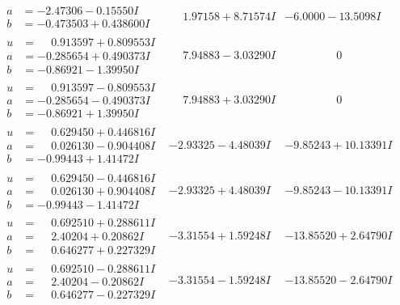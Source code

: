 \documentclass[1p]{elsarticle_modified}
\theoremstyle{definition}
\begin{document}
$$\begin{array}{c|c|c}
\begin{aligned}
a &= -2.47306 - 0.15550 I \\
b &= -0.473503 + 0.438600 I\end{aligned}
 & \phantom{-}1.97158 + 8.71574 I & -6.0000 - 13.5098 I \\ \hline\begin{aligned}
u &= \phantom{-}0.913597 + 0.809553 I \\
a &= -0.285654 + 0.490373 I \\
b &= -0.86921 - 1.39950 I\end{aligned}
 & \phantom{-}7.94883 - 3.03290 I & \phantom{-0.000000 } 0 \\ \hline\begin{aligned}
u &= \phantom{-}0.913597 - 0.809553 I \\
a &= -0.285654 - 0.490373 I \\
b &= -0.86921 + 1.39950 I\end{aligned}
 & \phantom{-}7.94883 + 3.03290 I & \phantom{-0.000000 } 0 \\ \hline\begin{aligned}
u &= \phantom{-}0.629450 + 0.446816 I \\
a &= \phantom{-}0.026130 - 0.904408 I \\
b &= -0.99443 + 1.41472 I\end{aligned}
 & -2.93325 - 4.48039 I & -9.85243 + 10.13391 I \\ \hline\begin{aligned}
u &= \phantom{-}0.629450 - 0.446816 I \\
a &= \phantom{-}0.026130 + 0.904408 I \\
b &= -0.99443 - 1.41472 I\end{aligned}
 & -2.93325 + 4.48039 I & -9.85243 - 10.13391 I \\ \hline\begin{aligned}
u &= \phantom{-}0.692510 + 0.288611 I \\
a &= \phantom{-}2.40204 + 0.20862 I \\
b &= \phantom{-}0.646277 + 0.227329 I\end{aligned}
 & -3.31554 + 1.59248 I & -13.85520 + 2.64790 I \\ \hline\begin{aligned}
u &= \phantom{-}0.692510 - 0.288611 I \\
a &= \phantom{-}2.40204 - 0.20862 I \\
b &= \phantom{-}0.646277 - 0.227329 I\end{aligned}
 & -3.31554 - 1.59248 I & -13.85520 - 2.64790 I \\ \hline\begin{aligned}

\end{aligned}
\end{array}$$
\end{document}
